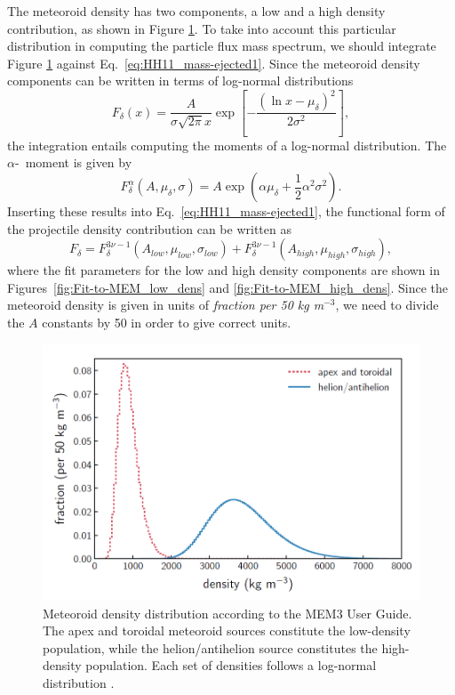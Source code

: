 \documentclass{hitec}
\numberwithin{equation}{section}
\begin{document}
The meteoroid density has two components, a low and a high density contribution, as shown in Figure \ref{fig:MEM_UG_Fig2.5_density-distribution}. To take into account this particular distribution in computing the particle flux mass spectrum, we should integrate Figure \ref{fig:MEM_UG_Fig2.5_density-distribution} against Eq.\ \ref{eq:HH11_mass-ejected1}. Since the meteoroid density components can be written in terms of log-normal distributions
\begin{equation}\label{eq:log-normal_distribution}
F_\delta(x) = \frac{A}{\sigma\sqrt{2\pi}x}\exp\left[-\frac{(\ln x-\mu_\delta)^2}{2\sigma^2}\right],
\end{equation}
the integration entails computing the moments of a log-normal distribution. The $\alpha$-~moment is given by
\begin{equation}\label{eq:log_normal-moment}
F^\alpha_\delta(A,\mu_\delta,\sigma) = A\exp\left(\alpha\mu_\delta+\frac{1}{2}\alpha^2\sigma^2\right).
\end{equation}
Inserting these results into Eq.\ \ref{eq:HH11_mass-ejected1}, the functional form of the projectile density contribution can be written as
\begin{equation}
F_\delta = F^{3\nu-1}_\delta(A_{low}, \mu_{low},\sigma_{low}) + F^{3\nu-1}_\delta(A_{high}, \mu_{high},\sigma_{high}),
\end{equation}
where the fit parameters for the low and high density components are shown in Figures~\ref{fig:Fit-to-MEM_low_dens} and \ref{fig:Fit-to-MEM_high_dens}. Since the meteoroid density is given in units of \textit{fraction per 50 kg m$^{-3}$}, we need to divide the $A$ constants by 50 in order to give correct units.

\begin{figure}[h!]
	\centering
	\includegraphics[scale=0.5]{MEM_UG_Fig2.5_density-distribution.PNG}
	\caption{Meteoroid density distribution according to the MEM3 User Guide. The apex and toroidal meteoroid sources constitute the low-density population, while the helion/antihelion source constitutes the high-density population. Each set of densities follows a log-normal distribution \citep[c.f. Figure 11,][]{moorhead2019nasa}.}\label{fig:MEM_UG_Fig2.5_density-distribution}
\end{figure}
\end{document}
